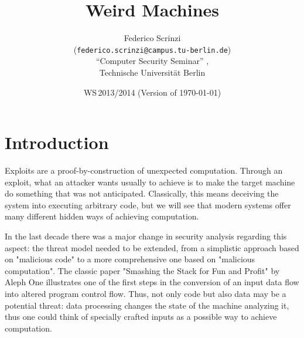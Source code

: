 \documentclass[11pt,twoside,a4paper]{article}
\begin{document}
\title{Weird Machines}
\author{Federico Scrinzi \\
  (\texttt{federico.scrinzi@campus.tu-berlin.de})\\[5mm]
  "`Computer Security Seminar"' , \\
  Technische Universität Berlin
}
  
\date{WS\,2013/2014 (Version of \today)}

\maketitle



\section{Introduction}
Exploits are a proof-by-construction of unexpected computation. Through an exploit, what an attacker wants usually to achieve is to make the target machine do something that was not anticipated. Classically, this means deceiving the system into executing arbitrary code, but we will see that modern systems offer many different hidden ways of achieving computation.

In the last decade there was a major change in security analysis regarding this aspect: the threat model needed to be extended, from a simplistic approach based on "malicious code" to a more comprehensive one based on "malicious computation". \cite{hund}
The classic paper "Smashing the Stack for Fun and Profit" by Aleph One \cite{smashing} illustrates one of the first steps in the conversion of an input data flow into altered program control flow. Thus, not only code but also data may be a potential threat: data processing changes the state of the machine analyzing it, thus one could think of specially crafted inputs as a possible way to achieve computation.
\end{document}
